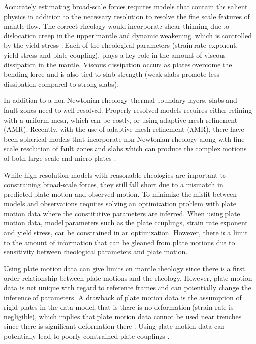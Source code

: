 \documentclass[12pt]{article}
\begin{document}
Accurately estimating broad-scale forces requires models that contain the salient physics in addition to the necessary resolution to resolve the fine scale features of mantle flow. The correct rheology would incorporate shear thinning due to dislocation creep in the upper mantle \citep{karato1993rheology} and dynamic weakening, which is controlled by the yield stress \citep{Stadler27082010, JGRB17312,GRL27564, GGGE1076,GRL20134}. Each of the rheological parameters (strain rate exponent, yield stress and plate coupling), plays a key role in the amount of viscous dissipation in the mantle. Viscous dissipation occurs as plates overcome the bending force and is also tied to slab strength (weak slabs promote less dissipation compared to strong slabs).

In addition to a non-Newtonian rheology, thermal boundary layers, slabs and fault zones need to well resolved. Properly resolved models requires either refining with a uniform mesh, which can be costly, or using adaptive mesh refinement (AMR). Recently, with the use of adaptive mesh refinement (AMR), there have been spherical models that incorporate non-Newtonian rheology along with fine-scale resolution of fault zones and slabs which can produce the complex motions of both large-scale and micro plates \citep{Stadler27082010,JGRB17312}. 

While high-resolution models with reasonable rheologies are important to constraining broad-scale forces, they still fall short due to a mismatch in predicted plate motion and observed motion. To minimize the misfit between models and observations requires solving an optimization problem with plate motion data \citep{ratnaswamy2015adjoint} where the constitutive parameters are inferred. When using plate motion data, model parameters such as the plate couplings, strain rate exponent and yield stress, can be constrained in an optimization. However, there is a limit to the amount of information that can be gleaned from plate motions \citep{ratnaswamy2015adjoint} due to sensitivity between rheological parameters and plate motion. 

Using plate motion data can give limits on mantle rheology since there is a first order relationship between plate motions and the rheology. However, plate motion data is not unique with regard to reference frames \citep{GRL4869,GGGE2060} and can potentially change the inference of parameters.  A drawback of plate motion data is the assumption of rigid plates in the data model, that is there is no deformation (strain rate is negligible), which implies that plate motion data cannot be used near trenches since there is significant deformation there \citep{kreemer2003integrated}. Using plate motion data can potentially lead to  poorly constrained plate couplings \citep{ratnaswamy2015adjoint}.
\end{document}
